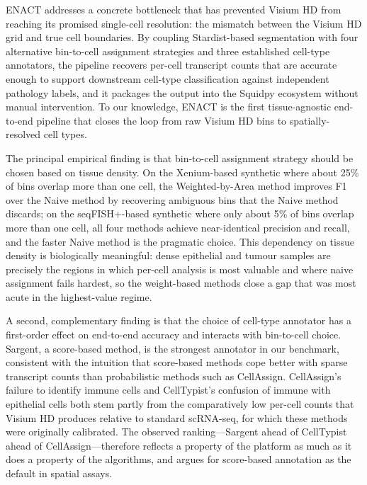 \documentclass[11pt]{article}
\begin{document}
ENACT addresses a concrete bottleneck that has prevented Visium HD from reaching its promised single-cell resolution: the mismatch between the Visium HD grid and true cell boundaries. By coupling Stardist-based segmentation with four alternative bin-to-cell assignment strategies and three established cell-type annotators, the pipeline recovers per-cell transcript counts that are accurate enough to support downstream cell-type classification against independent pathology labels, and it packages the output into the Squidpy ecosystem without manual intervention. To our knowledge, ENACT is the first tissue-agnostic end-to-end pipeline that closes the loop from raw Visium HD bins to spatially-resolved cell types.

The principal empirical finding is that bin-to-cell assignment strategy should be chosen based on tissue density. On the Xenium-based synthetic where about 25\% of bins overlap more than one cell, the Weighted-by-Area method improves F1 over the Naive method by recovering ambiguous bins that the Naive method discards; on the seqFISH+-based synthetic where only about 5\% of bins overlap more than one cell, all four methods achieve near-identical precision and recall, and the faster Naive method is the pragmatic choice. This dependency on tissue density is biologically meaningful: dense epithelial and tumour samples are precisely the regions in which per-cell analysis is most valuable and where naive assignment fails hardest, so the weight-based methods close a gap that was most acute in the highest-value regime.

A second, complementary finding is that the choice of cell-type annotator has a first-order effect on end-to-end accuracy and interacts with bin-to-cell choice. Sargent, a score-based method, is the strongest annotator in our benchmark, consistent with the intuition that score-based methods cope better with sparse transcript counts than probabilistic methods such as CellAssign. CellAssign's failure to identify immune cells and CellTypist's confusion of immune with epithelial cells both stem partly from the comparatively low per-cell counts that Visium HD produces relative to standard scRNA-seq, for which these methods were originally calibrated. The observed ranking---Sargent ahead of CellTypist ahead of CellAssign---therefore reflects a property of the platform as much as it does a property of the algorithms, and argues for score-based annotation as the default in spatial assays.
\end{document}
